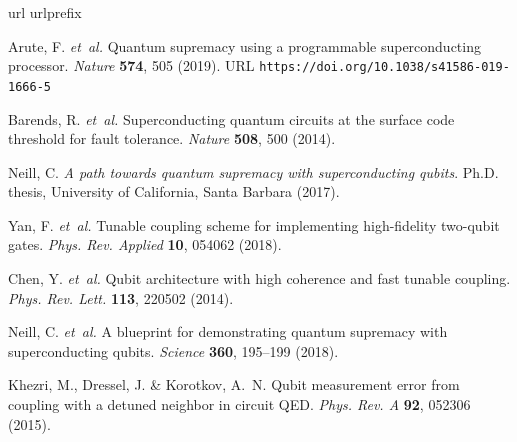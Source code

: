 \documentclass[%
 reprint,
superscriptaddress,
 amsmath,amssymb,
 pra,
]{revtex4-2}
\begin{document}
\begin{thebibliography}{100}
\expandafter\ifx\csname url\endcsname\relax
  \def\url#1{\texttt{#1}}\fi
\expandafter\ifx\csname urlprefix\endcsname\relax\def\urlprefix{URL }\fi
\providecommand{\bibinfo}[2]{#2}
\providecommand{\eprint}[2][]{\url{#2}}

\bibinfo{author}{Arute, F.} \emph{et~al.}
\newblock \bibinfo{title}{Quantum supremacy using a programmable superconducting processor}.
\newblock \emph{\bibinfo{journal}{Nature}} \textbf{\bibinfo{volume}{574}},
  \bibinfo{pages}{505} (\bibinfo{year}{2019}).
\newblock \urlprefix\url{https://doi.org/10.1038/s41586-019-1666-5}

\bibinfo{author}{Barends, R.} \emph{et~al.}
\newblock \bibinfo{title}{Superconducting quantum circuits at the surface code
  threshold for fault tolerance}.
\newblock \emph{\bibinfo{journal}{Nature}} \textbf{\bibinfo{volume}{508}},
  \bibinfo{pages}{500} (\bibinfo{year}{2014}).

\bibinfo{author}{Neill, C.}
\newblock \emph{\bibinfo{title}{A path towards quantum supremacy with
  superconducting qubits}}.
\newblock Ph.D. thesis, \bibinfo{school}{University of California, Santa
  Barbara} (\bibinfo{year}{2017}).

\bibinfo{author}{Yan, F.} \emph{et~al.}
\newblock \bibinfo{title}{Tunable coupling scheme for implementing
  high-fidelity two-qubit gates}.
\newblock \emph{\bibinfo{journal}{Phys. Rev. Applied}}
  \textbf{\bibinfo{volume}{10}}, \bibinfo{pages}{054062}
  (\bibinfo{year}{2018}).

\bibinfo{author}{Chen, Y.} \emph{et~al.}
\newblock \bibinfo{title}{Qubit architecture with high coherence and fast
  tunable coupling}.
\newblock \emph{\bibinfo{journal}{Phys. Rev. Lett.}}
  \textbf{\bibinfo{volume}{113}}, \bibinfo{pages}{220502}
  (\bibinfo{year}{2014}).

\bibinfo{author}{Neill, C.} \emph{et~al.}
\newblock \bibinfo{title}{A blueprint for demonstrating quantum supremacy with
  superconducting qubits}.
\newblock \emph{\bibinfo{journal}{Science}} \textbf{\bibinfo{volume}{360}},
  \bibinfo{pages}{195--199} (\bibinfo{year}{2018}).

\bibinfo{author}{Khezri, M.}, \bibinfo{author}{Dressel, J.} \&
  \bibinfo{author}{Korotkov, A.~N.}
\newblock \bibinfo{title}{Qubit measurement error from coupling with a detuned
  neighbor in circuit {QED}}.
\newblock \emph{\bibinfo{journal}{Phys. Rev. A}} \textbf{\bibinfo{volume}{92}},
  \bibinfo{pages}{052306} (\bibinfo{year}{2015}).


\end{thebibliography}
\end{document}
